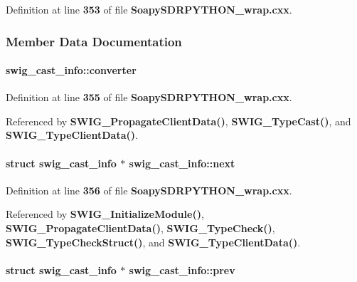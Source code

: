 Definition at line {\bf 353} of file {\bf Soapy\+S\+D\+R\+P\+Y\+T\+H\+O\+N\+\_\+wrap.\+cxx}.



\subsubsection{Member Data Documentation}
\paragraph[{converter}]{ swig\+\_\+cast\+\_\+info\+::converter}\label{structswig__cast__info_aa630fddfbb1bf9c97a03f9479ba32f76}


Definition at line {\bf 355} of file {\bf Soapy\+S\+D\+R\+P\+Y\+T\+H\+O\+N\+\_\+wrap.\+cxx}.



Referenced by {\bf S\+W\+I\+G\+\_\+\+Propagate\+Client\+Data()}, {\bf S\+W\+I\+G\+\_\+\+Type\+Cast()}, and {\bf S\+W\+I\+G\+\_\+\+Type\+Client\+Data()}.

\paragraph[{next}]{\setlength{\rightskip}{0pt plus 5cm}struct {\bf swig\+\_\+cast\+\_\+info} $\ast$ swig\+\_\+cast\+\_\+info\+::next}\label{structswig__cast__info_a2fc1b5702ec07bc23135df5c5db8e53e}


Definition at line {\bf 356} of file {\bf Soapy\+S\+D\+R\+P\+Y\+T\+H\+O\+N\+\_\+wrap.\+cxx}.



Referenced by {\bf S\+W\+I\+G\+\_\+\+Initialize\+Module()}, {\bf S\+W\+I\+G\+\_\+\+Propagate\+Client\+Data()}, {\bf S\+W\+I\+G\+\_\+\+Type\+Check()}, {\bf S\+W\+I\+G\+\_\+\+Type\+Check\+Struct()}, and {\bf S\+W\+I\+G\+\_\+\+Type\+Client\+Data()}.

\paragraph[{prev}]{\setlength{\rightskip}{0pt plus 5cm}struct {\bf swig\+\_\+cast\+\_\+info} $\ast$ swig\+\_\+cast\+\_\+info\+::prev}\label{structswig__cast__info_a0f5d1fc81b494c3e032a153609fd3268}


